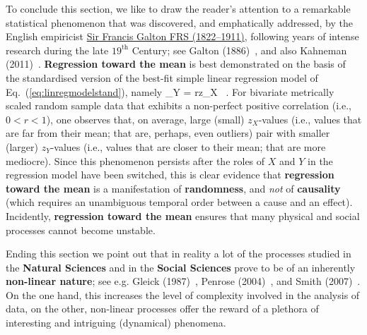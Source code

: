 \medskip
\noindent
To conclude this section, we like to draw the reader's attention 
to a remarkable statistical phenomenon that was discovered, and 
emphatically addressed, by the English empiricist 
\href{http://www-history.mcs.st-and.ac.uk/Biographies/Galton.html}{Sir
Francis Galton FRS (1822--1911)}, following years of intense 
research during the late $19^\mathrm{th}$ Century; see Galton 
(1886)~, and also Kahneman (2011)~.
\textbf{Regression toward the mean} is best demonstrated on the
basis of the standardised version of the best-fit simple linear 
regression model of Eq.~(\ref{eq:linregmodelstand}), namely
%
\be
{}
_{Y} = rz_{X} \ .
\ee
%
For bivariate metrically scaled random sample data that exhibits a 
non-perfect positive correlation (i.e., $0 < r < 1$), one observes
that, on average, large (small) $z_{X}$-values (i.e., values that
are far from their mean; that are, perhaps, even outliers) pair
with smaller (larger) $z_{Y}$-values (i.e., values that are closer
to their mean; that are more mediocre). Since this phenomenon 
persists after the roles of $X$ and $Y$ in the regression model 
have been switched, this is clear evidence that \textbf{regression 
toward the mean} is a manifestation of \textbf{randomness}, and 
\textit{not} of \textbf{causality} (which requires an unambiguous 
temporal order between a cause and an effect). Incidently,
\textbf{regression toward the mean} ensures that many physical and
social processes cannot become unstable.

\medskip
\noindent
Ending this section we point out that in reality a lot of the
processes studied in the \textbf{Natural Sciences} and in the
\textbf{Social Sciences} prove to be of an inherently
\textbf{non-linear nature};
see e.g. Gleick (1987)~, Penrose (2004)~,
and Smith (2007)~. On the one hand, this increases the
level of complexity involved in the analysis of data, on the other, 
non-linear processes offer the reward of a plethora of interesting 
and intriguing (dynamical) phenomena.

